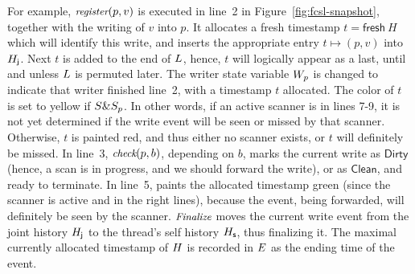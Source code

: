
\noindent
%
For example, $\textit{\small{register}}(p, v)$ is executed in line~2 in
Figure~\ref{fig:fcsl-snapshot}, together with the writing of $v$ into
$p$. It allocates a fresh timestamp $t = \mathsf{fresh}\ H$ which will
identify this write, and inserts the appropriate entry
$t \mapsto (p, v)$ into $H_{\mathsf{j}}$. Next $t$ is added to the end of
$L$, hence, $t$ will logically appear as a last, until and
unless $L$ is permuted later. The writer state variable $W_p$
is changed to indicate that writer finished line~2, with a timestamp
$t$ allocated. The color of $t$ is set to yellow if $S \& S_p$. In
other words, if an active scanner is in lines 7-9, it is not yet
determined if the write event will be seen or missed by that
scanner. Otherwise, $t$ is painted red, and thus either no scanner
exists, or $t$ will definitely be missed.
%
In line~3, $\textit{\small{check}}(p,b)$, depending on $b$, marks the current
write as $\mathsf{Dirty}$ (hence, a scan is in progress, and we should
forward the write), or as $\mathsf{Clean}$, and ready to terminate.
%
In line~5,  paints the allocated timestamp green
(since the scanner is active and in the right lines), because the
event, being forwarded, will definitely be seen by the scanner.
%
$\textit{\small{Finalize}}$ moves the current write event from the joint
history $H_{\mathsf{j}}$ to the thread's self history $H_{\mathsf{s}}$, thus
finalizing it. The maximal currently allocated timestamp of $H$ is recorded
in $E$ as the ending time of the event.











